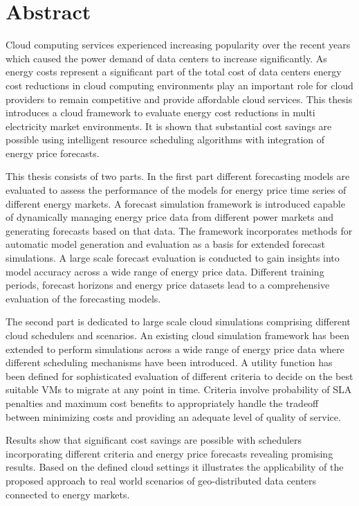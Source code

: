 \chapter*{Abstract}

Cloud computing services experienced increasing popularity over the recent years which caused the power demand of data centers to increase significantly. 
As energy costs represent a significant part of the total cost of data centers energy cost reductions in cloud computing environments play an important role for cloud providers to remain competitive and provide affordable cloud services. This thesis introduces a cloud framework to evaluate energy cost reductions in multi electricity market environments. It is shown that substantial cost savings are possible using intelligent resource scheduling algorithms with integration of energy price forecasts. 

This thesis consists of two parts. In the first part different forecasting models are evaluated to assess the performance of the models for energy price time series of different energy markets. A forecast simulation framework is introduced capable of dynamically managing energy price data from different power markets and generating forecasts based on that data. The framework incorporates methods for automatic model generation and evaluation as a basis for extended forecast simulations. 
A large scale forecast evaluation is conducted to gain insights into model accuracy across a wide range of energy price data. Different training periods, forecast horizons and energy price datasets lead to a comprehensive evaluation of the forecasting models. 

The second part is dedicated to large scale cloud simulations comprising different cloud schedulers and scenarios. An existing cloud simulation framework has been extended to perform simulations across a wide range of energy price data where different scheduling mechanisms have been introduced. 
A utility function has been defined for sophisticated evaluation of different criteria to decide on the best suitable VMs to migrate at any point in time. Criteria involve probability of SLA penalties and maximum cost benefits to appropriately handle the tradeoff between minimizing costs and providing an adequate level of quality of service. 

Results show that significant cost savings are possible with schedulers incorporating different criteria and energy price forecasts revealing promising results. Based on the defined cloud settings it illustrates the applicability of the proposed approach to real world scenarios of geo-distributed data centers connected to energy markets. 


